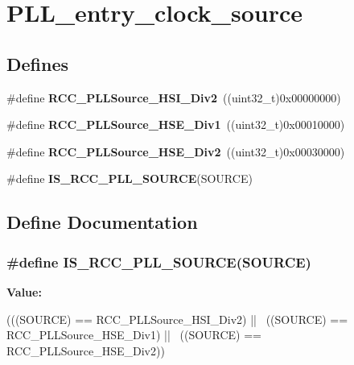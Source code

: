 \hypertarget{group__PLL__entry__clock__source}{
\section{PLL\_\-entry\_\-clock\_\-source}
\label{group__PLL__entry__clock__source}
}
\subsection*{Defines}
\begin{DoxyCompactItemize}
\item 
\hypertarget{group__PLL__entry__clock__source_ga53194dd3e2986980b156a3e8e456df06}{
\#define {\bfseries RCC\_\-PLLSource\_\-HSI\_\-Div2}~((uint32\_\-t)0x00000000)}
\label{group__PLL__entry__clock__source_ga53194dd3e2986980b156a3e8e456df06}

\item 
\hypertarget{group__PLL__entry__clock__source_ga62f02bf60a89bdef0d3a8137da3f4c2d}{
\#define {\bfseries RCC\_\-PLLSource\_\-HSE\_\-Div1}~((uint32\_\-t)0x00010000)}
\label{group__PLL__entry__clock__source_ga62f02bf60a89bdef0d3a8137da3f4c2d}

\item 
\hypertarget{group__PLL__entry__clock__source_ga24863bc670737a2f5abce546a49e620c}{
\#define {\bfseries RCC\_\-PLLSource\_\-HSE\_\-Div2}~((uint32\_\-t)0x00030000)}
\label{group__PLL__entry__clock__source_ga24863bc670737a2f5abce546a49e620c}

\item 
\#define {\bfseries IS\_\-RCC\_\-PLL\_\-SOURCE}(SOURCE)
\end{DoxyCompactItemize}


\subsection{Define Documentation}
\hypertarget{group__PLL__entry__clock__source_ga8a8a84a16989bb4e5aca1af65ccf9a1b}{
\subsubsection[{IS\_\-RCC\_\-PLL\_\-SOURCE}]{\setlength{\rightskip}{0pt plus 5cm}\#define IS\_\-RCC\_\-PLL\_\-SOURCE(SOURCE)}}
\label{group__PLL__entry__clock__source_ga8a8a84a16989bb4e5aca1af65ccf9a1b}
{\bfseries Value:}
\begin{DoxyCode}
(((SOURCE) == RCC_PLLSource_HSI_Div2) || \
                                   ((SOURCE) == RCC_PLLSource_HSE_Div1) || \
                                   ((SOURCE) == RCC_PLLSource_HSE_Div2))
\end{DoxyCode}
